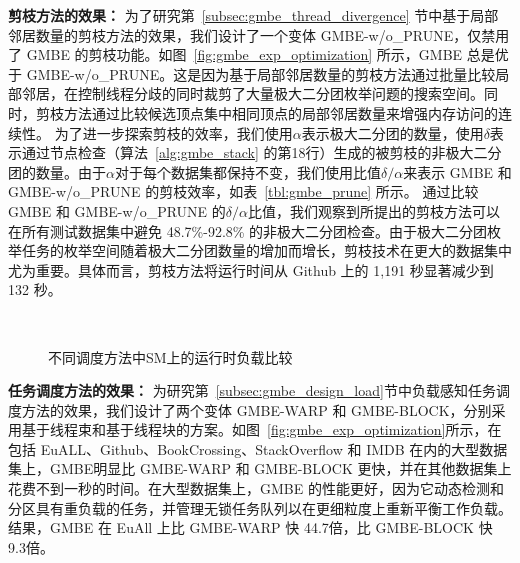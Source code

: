 \textbf{剪枝方法的效果：} 为了研究第~\ref{subsec:gmbe_thread_divergence} 节中基于局部邻居数量的剪枝方法的效果，我们设计了一个变体 GMBE-w/o\_PRUNE，仅禁用了 GMBE 的剪枝功能。如图~\ref{fig:gmbe_exp_optimization} 所示，GMBE 总是优于 GMBE-w/o\_PRUNE。这是因为基于局部邻居数量的剪枝方法通过批量比较局部邻居，在控制线程分歧的同时裁剪了大量极大二分团枚举问题的搜索空间。同时，剪枝方法通过比较候选顶点集中相同顶点的局部邻居数量来增强内存访问的连续性。
为了进一步探索剪枝的效率，我们使用$\alpha$表示极大二分团的数量，使用$\delta$表示通过节点检查（算法~\ref{alg:gmbe_stack} 的第18行）生成的被剪枝的非极大二分团的数量。由于$\alpha$对于每个数据集都保持不变，我们使用比值$\delta/\alpha$来表示 GMBE 和 GMBE-w/o\_PRUNE 的剪枝效率，如表~\ref{tbl:gmbe_prune} 所示。
通过比较 GMBE 和 GMBE-w/o\_PRUNE 的$\delta/\alpha$比值，我们观察到所提出的剪枝方法可以在所有测试数据集中避免 48.7\%-92.8\% 的非极大二分团检查。由于极大二分团枚举任务的枚举空间随着极大二分团数量的增加而增长，剪枝技术在更大的数据集中尤为重要。具体而言，剪枝方法将运行时间从 Github 上的 1,191 秒显著减少到 132 秒。

\begin{figure} 
	\centering
	 \\

	\caption{不同调度方法中SM上的运行时负载比较}

	\label{fig:gmbe_exp_balance}
\end{figure}


\textbf{任务调度方法的效果：} 为研究第~\ref{subsec:gmbe_design_load}节中负载感知任务调度方法的效果，我们设计了两个变体 GMBE-WARP 和 GMBE-BLOCK，分别采用基于线程束和基于线程块的方案。如图~\ref{fig:gmbe_exp_optimization}所示，在包括 EuALL、Github、BookCrossing、StackOverflow 和 IMDB 在内的大型数据集上，GMBE明显比 GMBE-WARP 和 GMBE-BLOCK 更快，并在其他数据集上花费不到一秒的时间。在大型数据集上，GMBE 的性能更好，因为它动态检测和分区具有重负载的任务，并管理无锁任务队列以在更细粒度上重新平衡工作负载。结果，GMBE 在 EuAll 上比 GMBE-WARP 快 44.7倍，比 GMBE-BLOCK 快 9.3倍。

